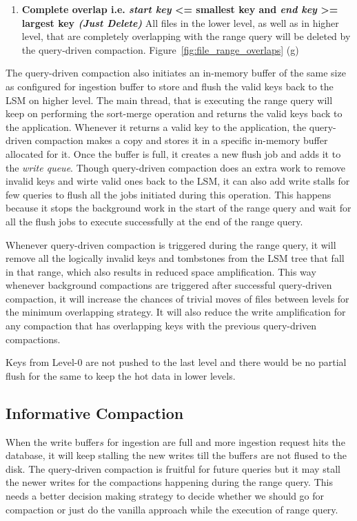 \begin{enumerate}
    \item \textbf{Complete overlap i.e. \textit{start key} <= smallest key and \textit{end key} >= largest key 
    \textit{(Just Delete)}} All files in the lower level, as well as in higher level, that are completely overlapping 
    with the range query will be deleted by the query-driven compaction. Figure~\ref{fig:file_range_overlaps} (g)
\end{enumerate}
The query-driven compaction also initiates an in-memory buffer of the same size as configured for ingestion buffer to store
and flush the valid keys back to the LSM on higher level. The main thread, that is executing the range 
query will keep on performing the sort-merge operation and returns the valid keys back to the application. Whenever it 
returns a valid key to the application, the query-driven compaction makes a copy and stores it in a specific in-memory 
buffer allocated for it. Once the buffer is full, it creates a new flush job and adds it to the \textit{write queue}. 
Though query-driven compaction does an extra work to remove invalid keys and wirte valid ones back to the LSM, it can 
also add write stalls for few queries to flush all the jobs initiated during this 
operation. This happens because it stops the background work in the start of the range query and wait for all the flush 
jobs to execute successfully at the end of the range query.

Whenever query-driven compaction is triggered during the range query, it will remove all the logically invalid keys and 
tombstones from the LSM tree that fall in that range, which also results in reduced space amplification. This way 
whenever background compactions are triggered after successful query-driven compaction, it will increase the chances of 
trivial moves of files between levels for the minimum overlapping strategy. It will also reduce the write 
amplification for any compaction that has overlapping keys with the previous query-driven compactions.

Keys from Level-0 are not pushed to the last level and there would be no partial flush for the same to 
keep the hot data in lower levels.

\subsection{Informative Compaction}

When the write buffer\(s\) for ingestion are full and more ingestion request hits the database, it will keep stalling the new writes 
till the buffer\(s\) are not flused to the disk. The query-driven compaction is fruitful for future queries but it may stall the 
newer writes for the compactions happening during the range query. This needs a better decision making
strategy to decide whether we should go for compaction or just do the vanilla approach while the execution of range query.

